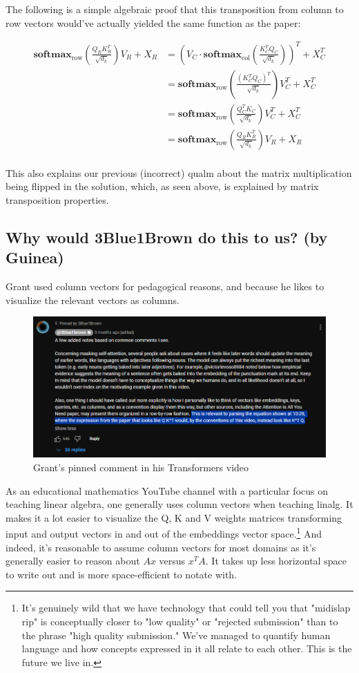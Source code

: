 \documentclass{article}
\begin{document}
The following is a simple algebraic proof that this transposition from column to row vectors would've actually yielded the same function as the paper:

\begin{align*}
    \mathbf{softmax}_\text{row}\left(\frac{Q_RK_R^T}{\sqrt{d_k}}\right) V_R + X_R &= \left(V_C \cdot \mathbf{softmax}_\text{col}\left(\frac{K_C^TQ_C}{\sqrt{d_k}}\right)\right)^T + X_C^T\\
    &= \mathbf{softmax}_\text{row}\left(\frac{(K_C^TQ_C)^T}{\sqrt{d_k}}\right)V_C^T + X_C^T\\
    &= \mathbf{softmax}_\text{row}\left(\frac{Q_C^TK_C}{\sqrt{d_k}}\right)V_C^T + X_C^T\\
    &= \mathbf{softmax}_\text{row}\left(\frac{Q_RK_R^T}{\sqrt{d_k}}\right)V_R + X_R\\
\end{align*}

This also explains our previous (incorrect) qualm about the matrix multiplication being flipped in the solution, which, as seen above, is explained by matrix transposition properties.

\subsection{Why would 3Blue1Brown do this to us? \footnotesize{(by Guinea)}}
Grant used column vectors for pedagogical reasons, and because he likes to visualize the relevant vectors as columns.
\begin{figure}[ht]
    \includegraphics[width=\textwidth]{grant_comment.png}
    \caption{Grant's pinned comment in his Transformers video}
\end{figure}


As an educational mathematics YouTube channel with a particular focus on teaching linear algebra, one generally uses column vectors when teaching linalg.
It makes it a lot easier to visualize the Q, K and V weights matrices transforming input and output vectors in and out of the embeddings vector space.\footnote{It's genuinely wild that we have technology that could tell you that "midislap rip" is conceptually closer to "low quality" or "rejected submission" than to the phrase "high quality submission." We've managed to quantify human language and how concepts expressed in it all relate to each other. This is the future we live in.}
And indeed, it's reasonable to assume column vectors for most domains as it's generally easier to reason about $Ax$ versus $x^TA$.
It takes up less horizontal space to write out and is more space-efficient to notate with.
\end{document}
